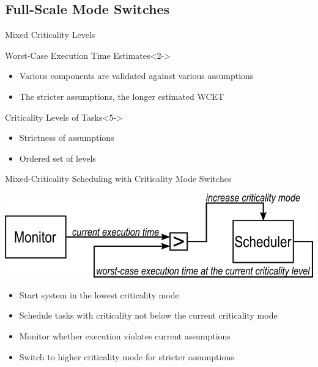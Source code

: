 \subsection{Full-Scale Mode Switches}

\begin{frame}{Mixed Criticality Levels}

\begin{minipage}{\textwidth}
\begin{block}{Worst-Case Execution Time Estimates}<2->
\begin{itemize}
    \item<3-> Various components are validated against various assumptions
    \item<4-> The stricter assumptions, the longer estimated WCET
\end{itemize}
\end{block}

\begin{block}{Criticality Levels of Tasks}<5->
\begin{itemize}
    \item<6-> Strictness of assumptions
    \item<7-> Ordered set of levels
\end{itemize}
\end{block}
\end{minipage}

\end{frame}

\begin{frame}{Mixed-Criticality Scheduling with Criticality Mode Switches}

\pause
\includegraphics[width=\textwidth]{Figures/mixed-crit-sched-robin}
\pause
\begin{itemize}[<+->]
    \item Start system in the lowest criticality mode
    \item Schedule tasks with criticality not below the current criticality mode
    \item Monitor whether execution violates current assumptions
    \item Switch to higher criticality mode for stricter assumptions
\end{itemize}

\end{frame}


